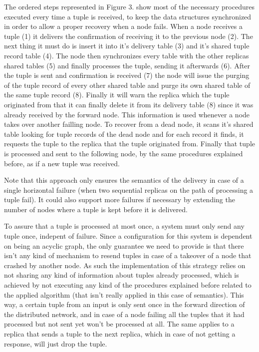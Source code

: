 \documentclass[times, 10pt,twocolumn]{article}
\begin{document}


The ordered steps represented in Figure 3. show most of the necessary
procedures executed every time a tuple is received, to keep the data
structures synchronized in order to allow a proper recovery when a node
fails. When a node receives a tuple (1) it delivers the confirmation of receiving
it to the previous node (2). The next thing it must do is
insert it into it's delivery table (3) and it's shared tuple record table
(4). The node then synchronizes every table with the other replicas shared
tables (5) and finally processes the tuple, sending it afterwards (6).
After the tuple is sent and confirmation is received (7) the node will
issue the purging of the tuple record of every other shared table
and purge its own shared table of the same tuple record (8). Finally it will warn
the replica which the tuple originated from that it can finally delete it
from its delivery table (8) since it was already received by the forward
node. This information is used whenever a node takes over another failling
node. To recover from a dead node, it scans it's shared table looking for tuple records of the dead node
and for each record it finds, it requests the tuple to the replica that
the tuple originated from. Finally that tuple is processed and sent to the
following node, by the same procedures explained before, as if a new tuple
was received. 

Note that this approach only ensures the semantics of the delivery in case
of a single horizontal failure (when two sequential replicas on the path
of processing a tuple fail). It could also support more failures if
necessary by extending the number of nodes where a tuple is kept before it
is delivered.


To assure that a tuple is processed at most once, a system
must only send any tuple once, indepent of failure. Since a configuration
for this system is dependent on being an acyclic graph, the only guarantee
we need to provide is that there isn't any kind of mechanism to resend
tuples in case of a takeover of a node that crashed by another node.  As
such the implementation of this strategy relies on not sharing any kind of
information about tuples already processed, which is achieved by not
executing any kind of the procedures explained before related to the
applied algorithm (that isn't really applied in this case of semantics).
This way, a certain tuple from an input is only sent once in the forward
direction of the distributed network, and in case of a node failing all
the tuples that it had processed but not sent yet won't be processed at
all. The same applies to a replica that sends a tuple to the next replica,
which in case of not getting a response, will just drop the tuple.
\end{document}
